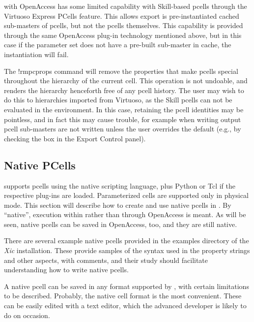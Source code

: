 {\Xic} with OpenAccess has some limited capability with Skill-based
pcells through the Virtuoso Express PCells feature.  This allows
export is pre-instantiated cached sub-masters of pcells, but not the
pcells themselves.  This capability is provided through the same
OpenAccess plug-in technology mentioned above, but in this case if the
parameter set does not have a pre-built sub-master in cache, the
instantiation will fail.

The {\cb !rmpcprops} command will remove the properties that make
pcells special throughout the hierarchy of the current cell.  This
operation is not undoable, and renders the hierarchy henceforth free
of any pcell history.  The user may wish to do this to hierarchies
imported from Virtuoso, as the Skill pcells can not be evaluated in
the {\Xic} environment.  In this case, retaining the pcell identities
may be pointless, and in fact this may cause trouble, for example when
writing output pcell sub-masters are not written unless the user
overrides the default (e.g., by checking the box in the {\cb Export
Control} panel).

\subsection{{\Xic} Native PCells}
\label{pcnative}

{\Xic} supports pcells using the native scripting language, plus
Python or Tcl if the respective plug-ins are loaded.  Parameterized
cells are supported only in physical mode.  This section will describe
how to create and use native pcells in {\Xic}.
By ``native'', execution within {\Xic} rather than through OpenAccess
is meant.  As will be seen, native pcells can be saved in OpenAccess,
too, and they are still native.

There are several example native pcells provided in the examples
directory of the {\it Xic} installation.  These provide samples of the
syntax used in the property strings and other aspects, with comments,
and their study should facilitate understanding how to write native
pcells.

A native pcell can be saved in any format supported by {\Xic}, with
certain limitations to be described.  Probably, the native cell format
is the most convenient.  These can be easily edited with a text
editor, which the advanced developer is likely to do on occasion.

